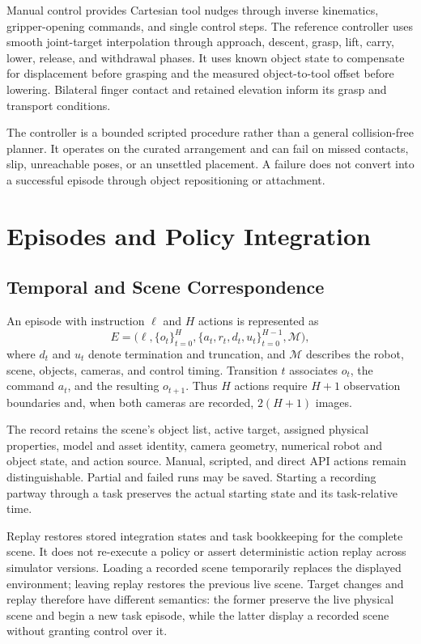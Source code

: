 \documentclass[10pt]{article}
\begin{document}
Manual control provides Cartesian tool nudges through inverse kinematics, gripper-opening commands, and single control steps. The reference controller uses smooth joint-target interpolation through approach, descent, grasp, lift, carry, lower, release, and withdrawal phases. It uses known object state to compensate for displacement before grasping and the measured object-to-tool offset before lowering. Bilateral finger contact and retained elevation inform its grasp and transport conditions.

The controller is a bounded scripted procedure rather than a general collision-free planner. It operates on the curated arrangement and can fail on missed contacts, slip, unreachable poses, or an unsettled placement. A failure does not convert into a successful episode through object repositioning or attachment.

\section{Episodes and Policy Integration}
\subsection{Temporal and Scene Correspondence}
An episode with instruction $\ell$ and $H$ actions is represented as
\begin{equation}
 E=\bigl(\ell,\{o_t\}_{t=0}^{H},\{a_t,r_t,d_t,u_t\}_{t=0}^{H-1},\mathcal{M}\bigr),
\end{equation}
where $d_t$ and $u_t$ denote termination and truncation, and $\mathcal{M}$ describes the robot, scene, objects, cameras, and control timing. Transition $t$ associates $o_t$, the command $a_t$, and the resulting $o_{t+1}$. Thus $H$ actions require $H+1$ observation boundaries and, when both cameras are recorded, $2(H+1)$ images.

The record retains the scene's object list, active target, assigned physical properties, model and asset identity, camera geometry, numerical robot and object state, and action source. Manual, scripted, and direct API actions remain distinguishable. Partial and failed runs may be saved. Starting a recording partway through a task preserves the actual starting state and its task-relative time.

Replay restores stored integration states and task bookkeeping for the complete scene. It does not re-execute a policy or assert deterministic action replay across simulator versions. Loading a recorded scene temporarily replaces the displayed environment; leaving replay restores the previous live scene. Target changes and replay therefore have different semantics: the former preserve the live physical scene and begin a new task episode, while the latter display a recorded scene without granting control over it.
\end{document}
